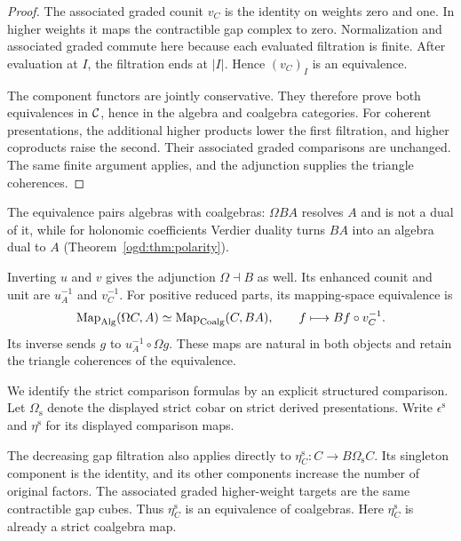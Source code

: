 \begin{proof}
The associated graded counit $v_C$ is the identity on weights zero and one.
In higher weights it maps the contractible gap complex to zero.
Normalization and associated graded commute here because each evaluated filtration is finite.
After evaluation at $I$, the filtration ends at $|I|$.
Hence $(v_C)_I$ is an equivalence.

The component functors are jointly conservative.
They therefore prove both equivalences in \(\mathcal C\), hence in the algebra and coalgebra categories.
For coherent presentations, the additional higher products lower the first filtration, and higher coproducts raise the second.
Their associated graded comparisons are unchanged.
The same finite argument applies, and the adjunction supplies the triangle coherences.
\end{proof}



The equivalence pairs algebras with coalgebras: \(\Omega BA\) resolves \(A\) and is not a dual of it, while for holonomic coefficients Verdier duality turns \(BA\) into an algebra dual to \(A\) (Theorem~\ref{ogd:thm:polarity}).

Inverting $u$ and $v$ gives the adjunction $\Omega\dashv B$ as well.
Its enhanced counit and unit are $u_A^{-1}$ and $v_C^{-1}$.
For positive reduced parts, its mapping-space equivalence is
\begin{equation}\label{ogd:eq:reverse-adjunction}
 \operatorname{Map}_{\operatorname{Alg}}(\Omega C,A)
 \simeq\operatorname{Map}_{\operatorname{Coalg}}(C,BA),
 \qquad f\longmapsto Bf\circ v_C^{-1}.
\end{equation}
Its inverse sends $g$ to $u_A^{-1}\circ\Omega g$.
These maps are natural in both objects and retain the triangle coherences of the equivalence.

We\label{ogd:def:strict-cobar-comparisons} identify the strict comparison formulas by an explicit structured comparison.
Let $\Omega_{\mathrm s}$ denote the displayed strict cobar on strict derived presentations.
Write $\epsilon^{\mathrm s}$ and $\eta^{\mathrm s}$ for its displayed comparison maps.

The decreasing gap filtration also applies directly to
$\eta^{\mathrm s}_C:C\to B\Omega_{\mathrm s}C$.
Its singleton component is the identity, and its other components increase the number of original factors.
The associated graded higher-weight targets are the same contractible gap cubes.
Thus $\eta^{\mathrm s}_C$ is an equivalence of coalgebras.
Here $\eta^{\mathrm s}_C$ is already a strict coalgebra map.

